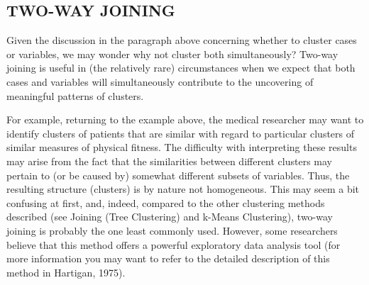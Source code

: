 \subsection{TWO-WAY JOINING}

Given the discussion in the paragraph above concerning whether to cluster cases or variables, we may wonder why not cluster both simultaneously? Two-way joining is useful in (the relatively rare) circumstances when we expect that both cases and variables will simultaneously contribute to the uncovering of meaningful patterns of clusters.



For example, returning to the example above, the medical researcher may want to identify clusters of patients that are similar with regard to particular clusters of similar measures of physical fitness. The difficulty with interpreting these results may arise from the fact that the similarities between different clusters may pertain to (or be caused by) somewhat different subsets of variables. Thus, the resulting structure (clusters) is by nature not homogeneous. This may seem a bit confusing at first, and, indeed, compared to the other clustering methods described (see Joining (Tree Clustering) and k-Means Clustering), two-way joining is probably the one least commonly used. However, some researchers believe that this method offers a powerful exploratory data analysis tool (for more information you may want to refer to the detailed description of this method in Hartigan, 1975).

